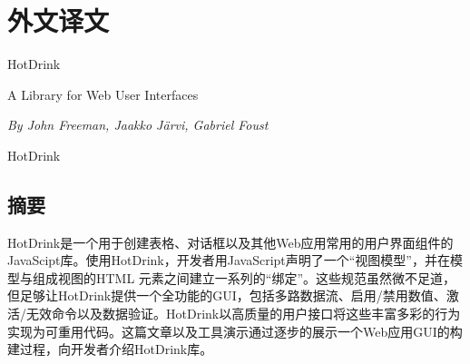 \chapter*{外\quad 文\quad 译\quad 文}

\begin{center}
{\heiti{}HotDrink}

{\heiti{}A Library for Web User Interfaces}

\textsl{By John Freeman, Jaakko Järvi, Gabriel Foust}

{\heiti{} HotDrink}
\end{center}


\section*{摘要}
HotDrink是一个用于创建表格、对话框以及其他Web应用常用的用户界面组件的JavaScipt库。使用HotDrink，开发者用JavaScript声明了一个“视图模型”，并在模型与组成视图的HTML 元素之间建立一系列的“绑定”。这些规范虽然微不足道，但足够让HotDrink提供一个全功能的GUI，包括多路数据流、启用/禁用数值、激活/无效命令以及数据验证。HotDrink以高质量的用户接口将这些丰富多彩的行为实现为可重用代码。这篇文章以及工具演示通过逐步的展示一个Web应用GUI的构建过程，向开发者介绍HotDrink库。
